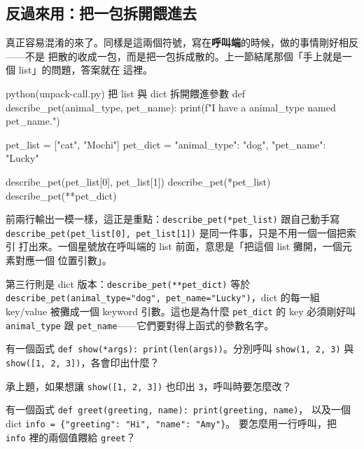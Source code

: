 \subsection*{反過來用：把一包拆開餵進去}

真正容易混淆的來了。同樣是這兩個符號，寫在\textbf{呼叫端}的時候，做的事情剛好相反——不是
把散的收成一包，而是把一包拆成散的。上一節結尾那個「手上就是一個 list」的問題，答案就在
這裡。

\begin{example}{python}{(unpack-call.py) 把 list 與 dict 拆開餵進參數}
def describe_pet(animal_type, pet_name):
    print(f"I have a {animal_type} named {pet_name}.")


pet_list = ["cat", "Mochi"]
pet_dict = {"animal_type": "dog", "pet_name": "Lucky"}

describe_pet(pet_list[0], pet_list[1])
describe_pet(*pet_list)
describe_pet(**pet_dict)
\end{example}


前兩行輸出一模一樣，這正是重點：\texttt{describe\_pet(*pet\_list)} 跟自己動手寫
\texttt{describe\_pet(pet\_list[0], pet\_list[1])} 是同一件事，只是不用一個一個把索引
打出來。一個星號放在呼叫端的 list 前面，意思是「把這個 list 攤開，一個元素對應一個
位置引數」。

第三行則是 dict 版本：\texttt{describe\_pet(**pet\_dict)} 等於
\texttt{describe\_pet(animal\_type="dog", pet\_name="Lucky")}，dict 的每一組 key/value
被攤成一個 keyword 引數。這也是為什麼 \texttt{pet\_dict} 的 key 必須剛好叫
\texttt{animal\_type} 跟 \texttt{pet\_name}——它們要對得上函式的參數名字。


\begin{drills}[label=drills:function-varargs]
\item 有一個函式 \texttt{def show(*args): print(len(args))}。分別呼叫
\texttt{show(1, 2, 3)} 與 \texttt{show([1, 2, 3])}，各會印出什麼？
\item 承上題，如果想讓 \texttt{show([1, 2, 3])} 也印出 \texttt{3}，呼叫時要怎麼改？
\item 有一個函式 \texttt{def greet(greeting, name): print(greeting, name)}，
以及一個 dict \texttt{info = \{"greeting": "Hi", "name": "Amy"\}}。
要怎麼用一行呼叫，把 \texttt{info} 裡的兩個值餵給 \texttt{greet}？
\end{drills}


